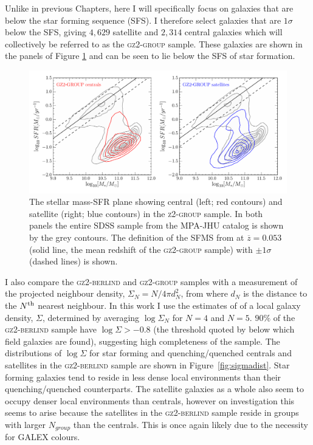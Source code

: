 Unlike in previous Chapters, here I will specifically focus on galaxies that are below the star forming sequence (SFS). I therefore select galaxies that are $1\sigma$ below the SFS, giving $4,629$ satellite and $2,314$ central galaxies which will collectively be referred to as the \textsc{gz2-group} sample. These galaxies are shown in the panels of Figure \ref{fig:sfrmass} and can be seen to lie below the SFS of star formation. 

\begin{figure}
\centering
\includegraphics[width=\textwidth]{environment/sfr_mass_quenched_centrals_satellites_gz2_group.pdf}
\caption[Stellar mass-SFR plane for the centrals and satellites of the \textsc{z2-group} sample]{The stellar mass-SFR plane showing central (left; red contours) and satellite (right; blue contours) in the \textsc{z2-group} sample. In both panels the entire SDSS sample from the MPA-JHU catalog is shown by the grey contours. The definition of the SFMS from \cite{peng10} at $\overline{z} = 0.053$ (solid line, the mean redshift of the \textsc{gz2-group} sample) with $\pm1\sigma$ (dashed lines) is shown.}
\label{fig:sfrmass}
\end{figure}


I also compare the \textsc{gz2-berlind} and \textsc{gz2-group} samples with a measurement of the projected neighbour density, $\Sigma_N = N/4\pi d_N^2$, from \cite{Baldry06} where $d_N$ is the distance to the $N^{\rm{th}}$ nearest neighbour. In this work I use the estimates of \cite{Bamford09} of a local galaxy density, $\Sigma$, determined by averaging $\log\Sigma_N$ for $N = 4$ and $N=5$. $90\%$ of the \textsc{gz2-berlind} sample have $\log\Sigma > -0.8$ (the threshold quoted by \citealt{Baldry06} below which field galaxies are found), suggesting high completeness of the sample. The distributions of $\log\Sigma$ for star forming and quenching/quenched centrals and satellites in the \textsc{gz2-berlind} sample are shown in Figure~\ref{fig:sigmadist}. Star forming galaxies tend to reside in less dense local environments than their quenching/quenched counterparts. The satellite galaxies as a whole also seem to occupy denser local environments than centrals, however on investigation this seems to arise because the satellites in the \textsc{gz2-berlind} sample reside in groups with larger $N_{group}$ than the centrals. This is once again likely due to the necessity for GALEX colours. 

